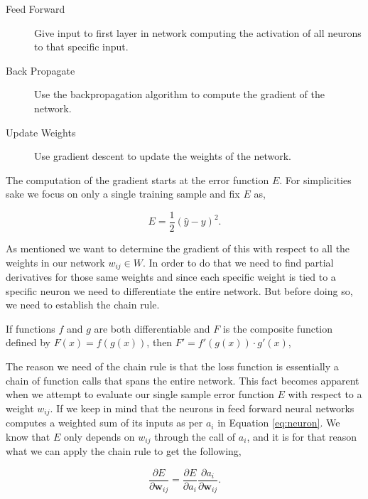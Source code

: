 \begin{description}
    \item[Feed Forward] Give input to first layer in network computing the
        activation of all neurons to that specific input.
    \item[Back Propagate] Use the backpropagation algorithm to compute the
        gradient of the network.
    \item[Update Weights] Use gradient descent to update the weights of the
        network.
\end{description}

The computation of the gradient starts at the error function $E$. For
simplicities sake we focus on only a single training sample and fix $E$ as,

\begin{equation}
    E = \frac{1}{2}(\hat{y} - y)^2.
\end{equation}

As mentioned we want to determine the gradient of this with respect to all the
weights in our network $w_{ij} \in W$. In order to do that we need to find
partial derivatives for those same weights and since each specific weight is
tied to a specific neuron we need to differentiate the entire network. But
before doing so, we need to establish the chain rule.

\begin{lemma}
\label{lemma:chainrule}

    If functions $f$ and $g$ are both differentiable and $F$ is the composite
    function defined by $F(x) = f(g(x))$, then $F' = f'(g(x)) \cdot g'(x)$,

\end{lemma}

The reason we need of the chain rule is that the loss function is essentially
a chain of function calls that spans the entire network. This fact becomes
apparent when we attempt to evaluate our single sample error function $E$ with
respect to a weight $w_{ij}$. If we keep in mind that the neurons in feed
forward neural networks computes a weighted sum of its inputs as per $a_i$ in
Equation \eqref{eq:neuron}. We know that $E$ only depends on $w_{ij}$ through
the call of $a_i$, and it is for that reason what we can apply the chain rule to
get the following,

\begin{equation}
    \label{eq:bp_start}
    \frac{\partial E}{\partial \mathbf{w}_{ij}} = \frac{\partial E}{\partial a_i}
    \frac{\partial a_i}{\partial \mathbf{w}_{ij}}.
\end{equation}

